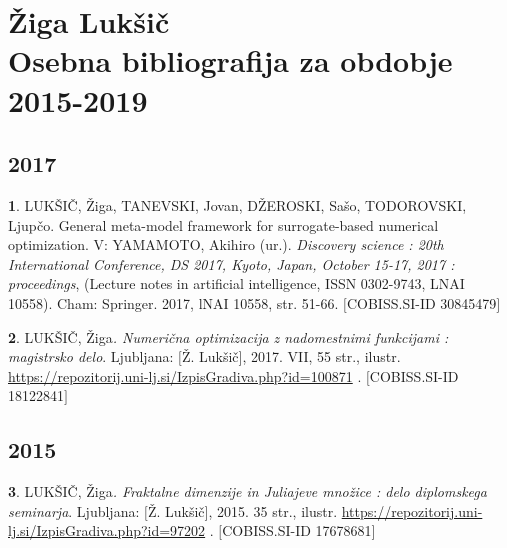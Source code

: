 \documentclass[10pt,a4paper]{book}
\begin{document}
\raggedright
  
\normalsize 
  
\onecolumn
\pagestyle{onesidesty}
\maintag{}
  
\chapter*{
\center \Large {\bf \v{Z}iga Luk\v{s}i\v{c}}\\
\center \Large {\bf Osebna bibliografija za obdobje 2015-2019}\\} 
  
\normalsize 
\nopagebreak
{}
\thispagestyle{chonesidesty}
  
\setcounter{page}{1}
  
\section*{\large {\bf 2017}}
\nopagebreak
  
{\bf 1}. LUK\v{S}I\v{C}, \v{Z}iga, TANEVSKI, Jovan, D\v{Z}EROSKI, Sa\v{s}o,
TODOROVSKI, Ljup\v{c}o. General meta-model framework for surrogate-based
numerical optimization. V: YAMAMOTO, Akihiro (ur.). {\it Discovery science
: 20th International Conference, DS 2017, Kyoto, Japan, October 15-17, 2017
: proceedings}, (Lecture notes in artificial intelligence, ISSN 0302-9743,
LNAI 10558). Cham: Springer. 2017, lNAI 10558, str. 51-66. $[$COBISS.SI-ID
30845479$]$\\
\vspace{1em}
  
{\bf 2}. LUK\v{S}I\v{C}, \v{Z}iga{\it . Numeri\v{c}na optimizacija z
nadomestnimi funkcijami : magistrsko delo}. Ljubljana: $[$\v{Z}.
Luk\v{s}i\v{c}$]$, 2017. VII, 55 str., ilustr.
\url{https://repozitorij.uni-lj.si/IzpisGradiva.php?id=100871}
. $[$COBISS.SI-ID 18122841$]$\\
\vspace{1em}
  
\section*{\large {\bf 2015}}
\nopagebreak
  
{\bf 3}. LUK\v{S}I\v{C}, \v{Z}iga{\it . Fraktalne dimenzije in Juliajeve
mno\v{z}ice : delo diplomskega seminarja}. Ljubljana: $[$\v{Z}.
Luk\v{s}i\v{c}$]$, 2015. 35 str., ilustr.
\url{https://repozitorij.uni-lj.si/IzpisGradiva.php?id=97202}
. $[$COBISS.SI-ID 17678681$]$\\
\vspace{1em}
  
\end{document}

